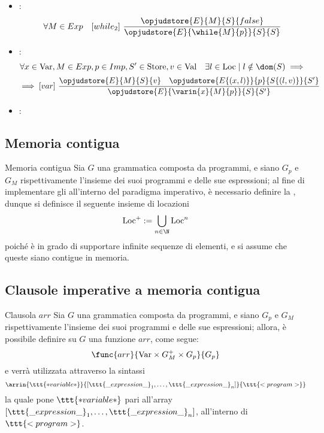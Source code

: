 \documentclass[a4paper, 12pt]{report}
\begin{document}
\begin{example}
\begin{itemize}
            \item {}:  $$\forall M \in Exp \quad [while_2] \ \dfrac{\opjudstore{E}{M}{S}{false}}{\opjudstore{E}{\while{M}{p}}{S}{S}}$$
            \item {}: $$\forall x \in \mathrm{Var}, M \in Exp, p \in Imp, S' \in \mathrm{Store}, v \in \mathrm{Val} \quad \exists l \in \mathrm{Loc} \mid l \notin \dom(S) \implies$$ $$\implies [var] \ \dfrac{\opjudstore{E}{M}{S}{v} \quad \opjudstore{E\{(x,l)\}}{p}{S\{(l,v)\}}{S'}}{\opjudstore{E}{\varin{x}{M}{p}}{S}{S'}}$$
            \item {}: 
        \end{itemize}
    \end{example}

    \subsection{Memoria contigua}

    \begin{frameddefn}{Memoria contigua}
        Sia $G$ una grammatica composta da programmi, e siano $G_p$ e $G_M$ rispettivamente l'insieme dei suoi programmi e delle sue espressioni; al fine di implementare gli  all'interno del paradigma imperativo, è necessario definire la , dunque si definisce il seguente insieme di locazioni $$\displaystyle \mathrm{Loc}^+ := \bigcup_{n \in \N}{\mathrm{Loc}^n}$$ poiché è in grado di supportare infinite sequenze di elementi, e si assume che queste siano contigue in memoria.
    \end{frameddefn}

    \subsection{Clausole imperative a memoria contigua}

    \begin{frameddefn}{Clausola $arr$}
        Sia $G$ una grammatica composta da programmi, e siano $G_p$ e $G_M$ rispettivamente l'insieme dei suoi programmi e delle sue espressioni; allora, è possibile definire su $G$ una funzione $arr$, come segue: $$\func{arr}{\mathrm{Var} \times G_M^+ \times G_p}{G_p}$$ e verrà utilizzata attraverso la sintassi $$\arrin{\ttt{*variable*}}{[\ttt{\_expression\_}_1, \ldots, \ttt{\_expression\_}_n]}{\ttt{<program>}}$$ la quale pone $\ttt{*variable*}$ pari all'array $[\ttt{\_expression\_}_1, \ldots, \ttt{\_expression\_}_n]$, all'interno di $\ttt{<program>}$.
    \end{frameddefn}
\end{document}
